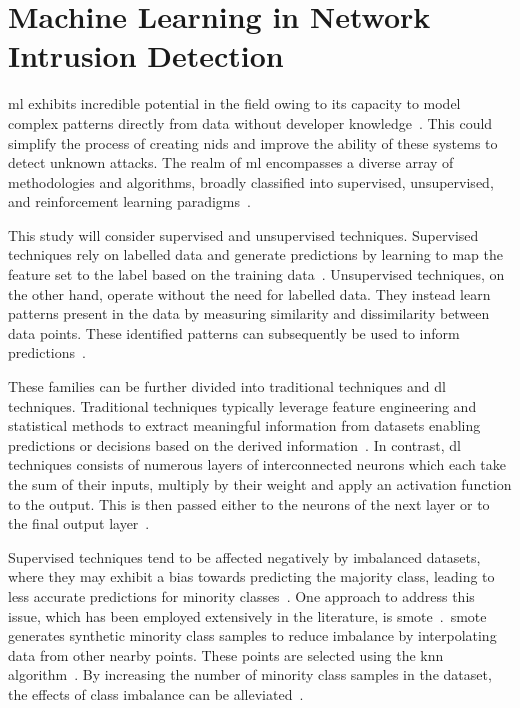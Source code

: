\section{Machine Learning in Network Intrusion
  Detection}%
\label{sec:ml_nids}

\gls{ml} exhibits incredible potential in the field owing to its capacity to
model complex patterns directly from data without developer
knowledge~\cite{ml}.
This could simplify the process of creating \gls{nids} and improve the ability
of these systems to detect unknown attacks. The realm of \gls{ml} encompasses a
diverse array of methodologies and algorithms, broadly classified into
supervised, unsupervised, and reinforcement learning
paradigms~\cite{ml_taxonomy}.

This study will consider supervised and unsupervised techniques. Supervised
techniques rely on labelled data and generate predictions by learning to map
the feature set to the label based on the training data~\cite{supervised_ml,
    ml_taxonomy}. Unsupervised techniques, on the other hand, operate without the
need for labelled data. They instead learn patterns present in the data by
measuring similarity and dissimilarity between data points. These identified
patterns can subsequently be used to inform predictions~\cite{unsupervised_ml,
    ml_taxonomy}.

These families can be further divided into traditional techniques and \gls{dl}
techniques. Traditional techniques typically leverage feature engineering and
statistical methods to extract meaningful information from datasets enabling
predictions or decisions based on the derived information~\cite{Najafabadi2015,
    useful_ml}. In contrast, \gls{dl} techniques consists of numerous layers of
interconnected neurons which each take the sum of their inputs, multiply by
their weight and apply an activation function to the output. This is then
passed either to the neurons of the next layer or to the final output
layer~\cite{dl}.


Supervised techniques tend to be affected negatively by imbalanced datasets,
where they may exhibit a bias towards predicting the majority class, leading to
less accurate predictions for minority classes~\cite{imbalance_prob,
    survey_cicids}. One approach to address this issue, which has been employed
extensively in the literature, is \gls{smote}~\cite{smote, smote_survey,
    Karatas, Jiang}.\ \gls{smote} generates synthetic minority class samples to
reduce imbalance by interpolating data from other nearby points. These points
are selected using the \gls{knn} algorithm~\cite{knn}. By increasing the number
of minority class samples in the dataset, the effects of class imbalance can be
alleviated~\cite{smote}.

